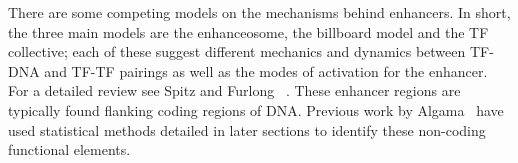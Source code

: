	There are some competing models on the mechanisms behind enhancers. In short, the three main models are the enhanceosome, the billboard model and the TF collective; each of these suggest different mechanics and dynamics between TF-DNA and TF-TF pairings as well as the modes of activation for the enhancer. For a detailed review see Spitz and Furlong ~\cite{spitz2012transcription}. These enhancer regions are typically found flanking coding regions of DNA. Previous work by Algama~\cite{algama2017genome} have used statistical methods detailed in later sections to identify these non-coding functional elements.
	
	 
	
	
